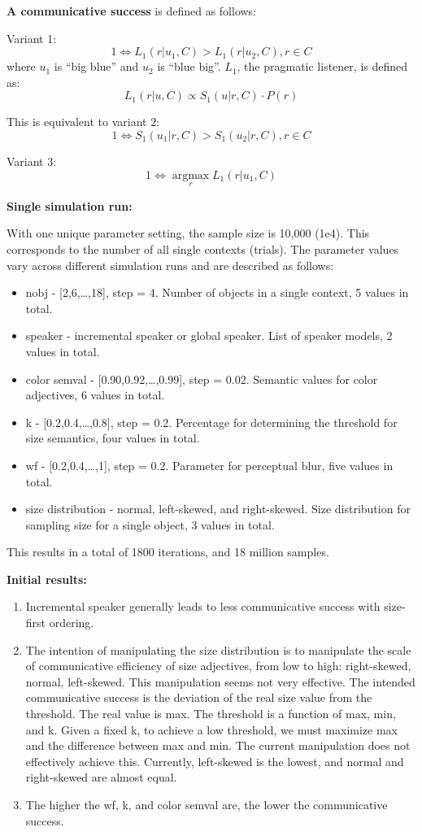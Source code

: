 \documentclass[
]{article}
\providecommand{\tightlist}{%
  \setlength{\itemsep}{0pt}\setlength{\parskip}{0pt}}
\begin{document}
\textbf{A communicative success} is defined as follows:

Variant 1: \[
1 \iff L_1(r|u_1, C) > L_1(r|u_2, C), r \in C
\] where \(u_1\) is ``big blue'' and \(u_2\) is ``blue big''. \(L_1\),
the pragmatic listener, is defined as: \[
L_1(r|u,C) \propto S_1(u|r,C) \cdot P(r)
\]

This is equivalent to variant 2: \[
1 \iff S_1(u_1|r, C) > S_1(u_2|r, C), r \in C
\]

Variant 3: \[
1 \iff \operatorname*{argmax}_r L_1(r|u_1,C)
\]

\textbf{Single simulation run:}

With one unique parameter setting, the sample size is 10,000 (1e4). This
corresponds to the number of all single contexts (trials). The parameter
values vary across different simulation runs and are described as
follows:

\begin{itemize}
\tightlist
\item
  nobj - {[}2,6,\ldots,18{]}, step = 4. Number of objects in a single
  context, 5 values in total.
\item
  speaker - incremental speaker or global speaker. List of speaker
  models, 2 values in total.
\item
  color semval - {[}0.90,0.92,\ldots,0.99{]}, step = 0.02. Semantic
  values for color adjectives, 6 values in total.
\item
  k - {[}0.2,0.4,\ldots,0.8{]}, step = 0.2. Percentage for determining
  the threshold for size semantics, four values in total.
\item
  wf - {[}0.2,0.4,\ldots,1{]}, step = 0.2. Parameter for perceptual
  blur, five values in total.
\item
  size distribution - normal, left-skewed, and right-skewed. Size
  distribution for sampling size for a single object, 3 values in total.
\end{itemize}

This results in a total of 1800 iterations, and 18 million samples.

\textbf{Initial results:}

\begin{enumerate}
\def\labelenumi{\arabic{enumi}.}
\tightlist
\item
  Incremental speaker generally leads to less communicative success with
  size-first ordering.
\item
  The intention of manipulating the size distribution is to manipulate
  the scale of communicative efficiency of size adjectives, from low to
  high: right-skewed, normal, left-skewed. This manipulation seems not
  very effective. The intended communicative success is the deviation of
  the real size value from the threshold. The real value is max. The
  threshold is a function of max, min, and k. Given a fixed k, to
  achieve a low threshold, we must maximize max and the difference
  between max and min. The current manipulation does not effectively
  achieve this. Currently, left-skewed is the lowest, and normal and
  right-skewed are almost equal.
\item
  The higher the wf, k, and color semval are, the lower the
  communicative success.
\end{enumerate}
\end{document}
